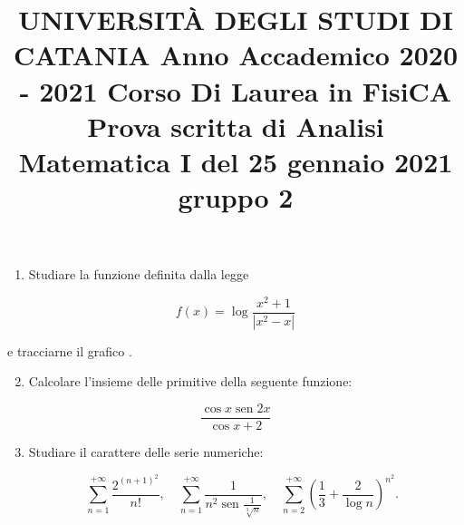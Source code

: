 \documentclass[10pt]{article}
\title{UNIVERSITÀ DEGLI STUDI DI CATANIA 
 Anno Accademico 2020 - 2021 
 Corso Di Laurea in FisiCA 
 Prova scritta di Analisi Matematica I del 25 gennaio 2021 
 gruppo 2 }
\author{}
\date{}
\begin{document}
\maketitle
\begin{enumerate}
  \item Studiare la funzione definita dalla legge
\end{enumerate}

\[
f(x)=\log \frac{x^{2}+1}{\left|x^{2}-x\right|}
\]

e tracciarne il grafico .

\begin{enumerate}
  \setcounter{enumi}{1}
  \item Calcolare l'insieme delle primitive della seguente funzione:
\end{enumerate}

\[
\frac{\cos x \operatorname{sen} 2 x}{\cos x+2}
\]

\begin{enumerate}
  \setcounter{enumi}{2}
  \item Studiare il carattere delle serie numeriche:
\end{enumerate}

\[
\quad \sum_{n=1}^{+\infty} \frac{2^{(n+1)^{2}}}{n !}, \quad \sum_{n=1}^{+\infty} \frac{1}{n^{2} \operatorname{sen} \frac{1}{\sqrt[3]{n}}}, \quad \sum_{n=2}^{+\infty}\left(\frac{1}{3}+\frac{2}{\log n}\right)^{n^{2}} .
\]
\end{document}
